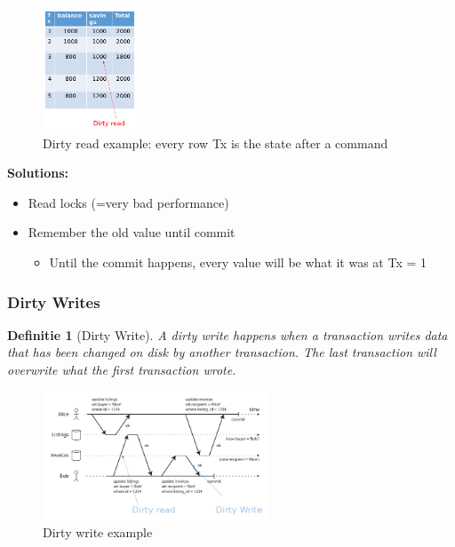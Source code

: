 \documentclass{article}
\newtheorem{theorem}{Definitie}[section]
\begin{document}
\begin{figure}[H]
    \centering
    \includegraphics[width=0.25\textwidth]{dirty-reads.png}
    \caption{Dirty read example: every row Tx is the state after a command}
\end{figure}
 

\textbf{Solutions:}

\begin{itemize}
    \item Read locks (=very bad performance)
    \item Remember the old value until commit
    \begin{itemize}
        \item Until the commit happens, every value will be what it was at Tx = 1
    \end{itemize}
\end{itemize}

\subsubsection{Dirty Writes}

\begin{theorem}[Dirty Write]
A dirty write happens when a transaction writes data that has been changed on disk by another transaction. 
The last transaction will overwrite what the first transaction wrote.
\end{theorem}


\begin{figure}[H]
    \centering
    \includegraphics[width=0.6\textwidth]{dirty-reads-lock.png}
    \caption{Dirty write example}
\end{figure}
\end{document}
